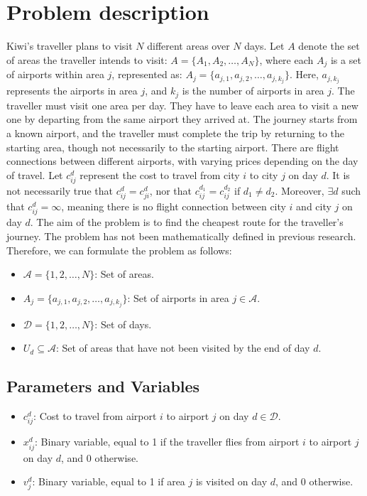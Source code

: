 \section{Problem description}

Kiwi's traveller plans to visit \(N\) different areas over \(N\) days. Let \(A\) denote the set of areas the traveller intends to visit:  
$A = \{A_1, A_2, \ldots, A_N\}$, where each \(A_j\) is a set of airports within area \(j\), represented as:  $A_j = \{a_{j,1}, a_{j,2}, \ldots, a_{j,k_j}\}$. Here, \(a_{j,k_j}\) represents the airports in area \(j\), and \(k_j\) is the number of airports in area \(j\). 
%
The traveller must visit one area per day. They have to leave each area to visit a new one by departing from the same airport they arrived at. The journey starts from a known airport, and the traveller must complete the trip by returning to the starting area, though not necessarily to the starting airport. 
%
There are flight connections between different airports, with varying prices depending on the day of travel. Let \(c^{d}_{ij}\) represent the cost to travel from city \(i\) to city \(j\) on day \(d\). It is not necessarily true that \(c^{d}_{ij} = c^{d}_{ji}\), nor that \(c^{d_1}_{ij} = c^{d_2}_{ij}\) if \(d_1 \neq d_2\). Moreover, \(\exists  d\) such that \(c^{d}_{ij} = \infty\), meaning there is no flight connection between city \(i\) and city \(j\) on day \(d\). 
%
The aim of the problem is to find the cheapest route for the traveller's journey. 
%
The problem has not been mathematically defined in previous research. Therefore, we can formulate the problem as follows:

\begin{itemize}
    \item $\mathcal{A} = \{1, 2, \ldots, N\}$: Set of areas.
    \item $A_j = \{a_{j,1}, a_{j,2}, \ldots, a_{j,k_j}\}$: Set of airports in area $j \in \mathcal{A}$.
    \item $\mathcal{D} = \{1, 2, \ldots, N\}$: Set of days.
    \item $U_d \subseteq \mathcal{A}$: Set of areas that have not been visited by the end of day $d$.
\end{itemize}

\subsection*{Parameters and Variables}
\begin{itemize}
    \item $c_{ij}^d$: Cost to travel from airport $i$ to airport $j$ on day $d \in \mathcal{D}$.
    \item $x_{ij}^d$: Binary variable, equal to 1 if the traveller flies from airport $i$ to airport $j$ on day $d$, and 0 otherwise.
    \item $v_j^d$: Binary variable, equal to 1 if area $j$ is visited on day $d$, and 0 otherwise.
\end{itemize}

